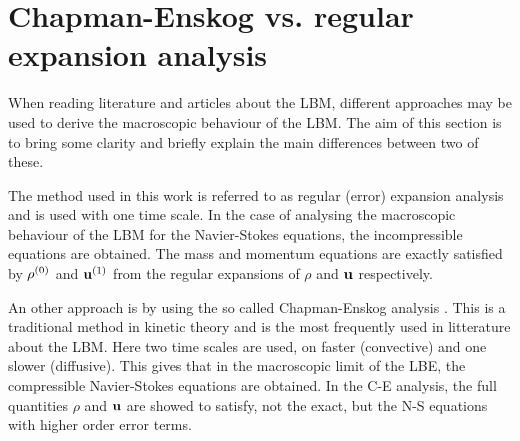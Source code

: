 \section{Chapman-Enskog vs. regular expansion analysis}
When reading literature and articles about the LBM, different
approaches may be used to derive the macroscopic behaviour of the
LBM. The aim of this section is to bring some clarity and briefly
explain the main differences between two of these.

The method used in this work is referred to as regular (error)
expansion analysis \cite{junk-comparison} and is used with one time
scale. In the case of analysing the macroscopic behaviour of the LBM
for the Navier-Stokes equations, the incompressible equations are
obtained. The mass and momentum equations are exactly satisfied by
$\rho^{(0)}$ and $\mathbf{u}^{(1)}$ from the regular expansions of $\rho$ and
$\mathbf{u}$ respectively.

An other approach is by using the so called Chapman-Enskog analysis
\cite{wolf-gladrow}. This is a traditional method in kinetic theory
and is the most frequently used in litterature about the LBM. Here two
time scales are used, on faster (convective) and one slower
(diffusive). This gives that in the macroscopic limit of the LBE, the
compressible Navier-Stokes equations are obtained. In the C-E analysis,
the full quantities $\rho$ and $\mathbf{u}$ are showed to satisfy, not the
exact, but the N-S equations with higher order error terms.

